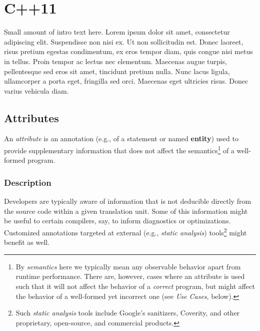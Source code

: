 \documentclass[twoside,10pt,letterpaper,usenames]{newstyle-PearsonGeneric-7-38}
\newcommand{\intraref}[1]{\textit{#1}}
\begin{document}




% 
% 
% 



\section[C++11]{C++11}\label{c++11}

Small amount of intro text here. Lorem ipsum dolor sit amet, consectetur
adipiscing elit. Suspendisse non nisi ex. Ut non sollicitudin est. Donec
laoreet, risus pretium egestas condimentum, ex eros tempor diam, quis
congue nisi metus in tellus. Proin tempor ac lectus nec elementum.
Maecenas augue turpis, pellentesque sed eros sit amet, tincidunt pretium
nulla. Nunc lacus ligula, ullamcorper a porta eget, fringilla sed orci.
Maecenas eget ultricies risus. Donec varius vehicula diam.

\subsection[Attributes]{Attributes}\label{attributes}

An \emph{attribute} is an annotation (e.g., of a statement or named
\textbf{entity}) used to provide supplementary information that does not
affect the semantics{\cprotect\footnote{By \emph{semantics} here we
typically mean any observable behavior apart from runtime performance.
There are, however, cases where an attribute is used such that it will
not affect the behavior of a \emph{correct} program, but might affect
the behavior of a well-formed yet incorrect one (see {\intraref{{Use
Cases}}}, below).}} of a well-formed program.

\subsubsection[Description]{Description}\label{description}

Developers are typically aware of information that is not deducible
directly from the source code within a given translation unit. Some of
this information might be useful to certain compilers, say, to inform
diagnostics or optimizations. Customized annotations targeted at
external (e.g., \emph{static analysis}) tools{\cprotect\footnote{Such
\emph{static analysis} tools include Google's sanitizers, Coverity,
and other proprietary, open-source, and commercial products.}} might
benefit as well.
\end{document}
